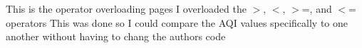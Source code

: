 This is the operator overloading pages I overloaded the $>$, $<$, $>$=, and $<$= operators This was done so I could compare the A\+Q\+I values specifically to one another without having to chang the authors code 